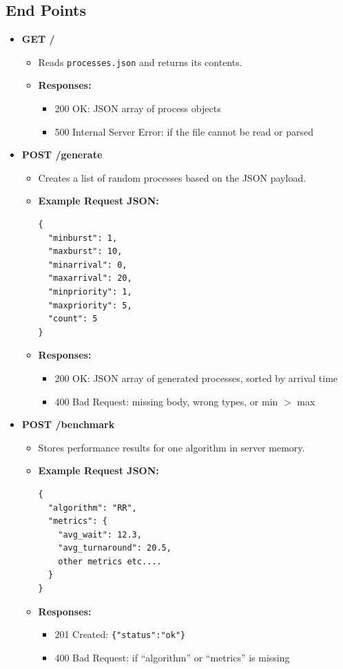 \documentclass[conference]{IEEEtran}
\begin{document}
\subsection{End Points}
\begin{itemize}
  \item \textbf{GET /}  
    \begin{itemize}
      \item Reads \texttt{processes.json} and returns its contents.  
      \item \textbf{Responses:}
      \begin{itemize}
        \item 200 OK: JSON array of process objects  
        \item 500 Internal Server Error: if the file cannot be read or parsed  
      \end{itemize}
    \end{itemize}

  \item \textbf{POST /generate}  
    \begin{itemize}
      \item Creates a list of random processes based on the JSON payload.  
      \item \textbf{Example Request JSON:}
      \begin{verbatim}
{
  "minburst": 1,
  "maxburst": 10,
  "minarrival": 0,
  "maxarrival": 20,
  "minpriority": 1,
  "maxpriority": 5,
  "count": 5
}
      \end{verbatim}
      \item \textbf{Responses:}
      \begin{itemize}
        \item 200 OK: JSON array of generated processes, sorted by arrival time  
        \item 400 Bad Request: missing body, wrong types, or min $>$ max  
      \end{itemize}
    \end{itemize}

  \item \textbf{POST /benchmark}  
    \begin{itemize}
      \item Stores performance results for one algorithm in server memory.  
      \item \textbf{Example Request JSON:}
      \begin{verbatim}
{
  "algorithm": "RR",
  "metrics": {
    "avg_wait": 12.3,
    "avg_turnaround": 20.5,
    other metrics etc....
  }
}
      \end{verbatim}
      \item \textbf{Responses:}
      \begin{itemize}
        \item 201 Created: \texttt{\{"status":"ok"\}}  
        \item 400 Bad Request: if “algorithm” or “metrics” is missing  
      \end{itemize}
    \end{itemize}


\end{itemize}
\end{document}
